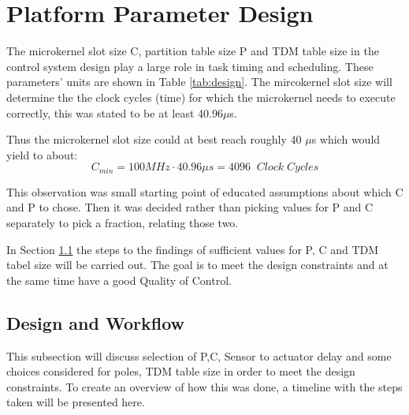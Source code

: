 \section{Platform Parameter Design}
\label{sec:platform}

The microkernel slot size C, partition table size P and TDM table size in the control system design play a large role in task timing and scheduling. These parameters' units are shown in Table \ref{tab:design}. The mircokernel slot size will determine the the clock cycles (time) for which the microkernel needs to execute correctly, this was stated to be at least 40.96$\mu$s.

Thus the microkernel slot size could at best reach roughly 40 $\mu$s which would yield to about: $$ C_{min} = 100MHz \cdot 40.96 \mu s = 4096 \;\;Clock \; Cycles$$

This observation was small starting point of educated assumptions about which C and P to chose. Then it was decided rather than picking values for P and C separately to pick a fraction, relating those two. 

In Section \ref{sec:steps} the steps to the findings of sufficient values for P, C and TDM tabel size will be carried out. The goal is to meet the design constraints and at the same time have a good Quality of Control.

\subsection{Design and Workflow}
\label{sec:steps}
This subsection will discuss selection of P,C, Sensor to actuator delay and some choices considered for poles, TDM table size in order to meet the design constraints. To create an overview of how this was done, a timeline with the steps taken will be presented here.

